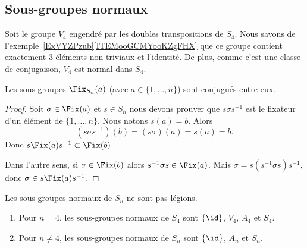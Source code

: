 \subsection{Sous-groupes normaux}

\begin{normaltext}     \label{NORMooQAZTooBQLqDn}
	Soit le groupe \( V_4\) engendré par les doubles transpositions de \( S_4\). Nous savons de l'exemple~\ref{ExVYZPzub}\ref{ITEMooGCMYooKZgFHX} que ce groupe contient exactement \( 3\) éléments non triviaux et l'identité. De plus, comme c'est une classe de conjugaison, \( V_4\) est normal dans \( S_4\).
\end{normaltext}

\begin{lemma}
	Les sous-groupes \( \Fix_{S_n}(a)\) (avec \( a\in\{ 1,\ldots, n \}\)) sont conjugués entre eux.
\end{lemma}

\begin{proof}
	Soit \( \sigma\in \Fix(a)\) et \( s\in S_n\) nous devons prouver que \( s \sigma s^{-1}\) est le fixateur d'un élément de \( \{ 1,\ldots, n \}\). Nous notons \( s(a)=b\). Alors
	\begin{equation}
		(s\sigma s^{-1})(b)=(s\sigma)(a)=s(a)=b.
	\end{equation}
	Donc \( s\Fix(a)s^{-1}\subset \Fix(b)\).

	Dans l'autre sens, si \( \sigma\in \Fix(b)\) alors \( s^{-1} \sigma s\in\Fix(a)\). Mais \( \sigma=s(s^{-1}\sigma s)s^{-1}\), donc \( \sigma\in s\Fix(a)s^{-1}\).
\end{proof}

\begin{proposition}     \label{PROPooOTJAooUbzGZm}
	Les sous-groupes normaux de \( S_n\) ne sont pas légions.
	\begin{enumerate}
		\item
		      Pour \( n=4\), les sous-groupes normaux de \( S_4\) sont \(  \{ \id \}  \), \( V_4\), \( A_4\) et \( S_4\).
		\item
		      Pour \( n\neq 4\), les sous-groupes normaux de \( S_n\) sont \( \{ \id \}\), \( A_n\) et \( S_n\).
	\end{enumerate}
\end{proposition}

